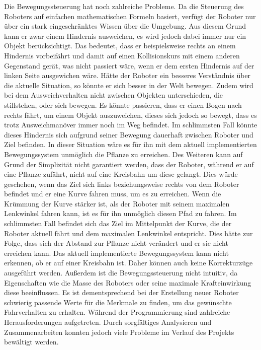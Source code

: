 Die Bewegungssteuerung hat noch zahlreiche Probleme. Da die Steuerung des Roboters auf einfachen mathematischen Formeln basiert, verfügt der Roboter nur über ein stark eingeschränktes Wissen über die Umgebung. Aus diesem Grund kann er zwar einem Hindernis ausweichen, es wird jedoch dabei immer nur ein Objekt berücksichtigt. Das bedeutet, dass er beispielsweise rechts an einem Hindernis vorbeifährt und damit auf einen Kollisionskurs mit einem anderen Gegenstand gerät, was nicht passiert wäre, wenn er dem ersten Hindernis auf der linken Seite ausgewichen wäre. Hätte der Roboter ein besseres Verständnis über die aktuelle Situation, so könnte er sich besser in der Welt bewegen. Zudem wird bei dem Ausweichverhalten nicht zwischen Objekten unterschieden, die stillstehen, oder sich bewegen. Es könnte passieren, dass er einen Bogen nach rechts fährt, um einem Objekt auszuweichen, dieses sich jedoch so bewegt, dass es trotz Ausweichmanöver immer noch im Weg befindet. Im schlimmsten Fall könnte dieses Hindernis sich aufgrund seiner Bewegung dauerhaft zwischen Roboter und Ziel befinden. In dieser Situation wäre es für ihn mit dem aktuell implementierten Bewegungssystem unmöglich die Pflanze zu erreichen.
Des Weiteren kann auf Grund der Simplizität nicht garantiert werden, dass der Roboter, während er auf eine Pflanze zufährt, nicht auf eine Kreisbahn um diese gelangt. Dies würde geschehen, wenn das Ziel sich links beziehungsweise rechts von dem Roboter befindet und er eine Kurve fahren muss, um es zu erreichen. Wenn die Krümmung der Kurve stärker ist, als der Roboter mit seinem maximalen Lenkwinkel fahren kann, ist es für ihn unmöglich diesen Pfad zu fahren. Im schlimmsten Fall befindet sich das Ziel im Mittelpunkt der Kurve, die der Roboter aktuell fährt und dem maximalen Lenkwinkel entspricht. Dies hätte zur Folge, dass sich der Abstand zur Pflanze nicht verändert und er sie nicht erreichen kann. Das aktuell implementierte Bewegungssystem kann nicht erkennen, ob er auf einer Kreisbahn ist. Daher können auch keine Korrekturzüge ausgeführt werden.
Außerdem ist die Bewegungssteuerung nicht intuitiv, da Eigenschaften wie die Masse des Roboters oder seine maximale Krafteinwirkung diese beeinflussen. Es ist dementsprechend bei der Erstellung neuer Roboter schwierig passende Werte für die Merkmale zu finden, um das gewünschte Fahrverhalten zu erhalten.
Während der Programmierung sind zahlreiche Herausforderungen aufgetreten. Durch sorgfältiges Analysieren und Zusammenarbeiten konnten jedoch viele Probleme im Verlauf des Projekts bewältigt werden.
